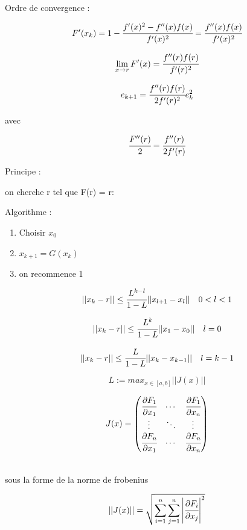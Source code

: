 Ordre de convergence :

$$ F'(x_k) = 1 - \cfrac{f'(x)^2 - f''(x)f(x)}{f'(x)^2} = \cfrac{f''(x)f(x)}{f'(x)^2}$$

$$\lim_{x \to r} F'(x) = \cfrac{f''(r)f(r)}{f'(r)^2}$$ 

$$ e_{k+1} = \cfrac{f''(r)f(r)}{2f'(r)^2} e_k^2$$ 

avec 

$$\cfrac{F''(r)}{2} = \cfrac{f''(r)}{2f'(r)}$$



Principe :

on cherche r tel que F(r) = r:


Algorithme :

\begin{enumerate}
    \item Choisir $x_0$
    \item $x_{k+1} = G(x_k)$
    \item on recommence 1
\end{enumerate}

$$||x_{k} - r|| \leq \cfrac{L^{k-l}}{1-L} ||x_{l+1} - x_{l}|| \quad  0 < l < 1$$


$$||x_{k} - r|| \leq \cfrac{L^{k}}{1-L} ||x_{1} - x_{0}|| \quad  l = 0$$


$$||x_{k} - r|| \leq \cfrac{L}{1-L} ||x_{k} - x_{k-1}|| \quad  l = k-1$$

$$ L := max_{x \in [a,b]} ||J(x)||$$


$$J(x) = \begin{pmatrix}
    \cfrac{\partial F_1}{\partial x_1} &  \cdots & \cfrac{\partial F_1}{\partial x_n} \\
    \vdots  & \ddots & \vdots  \\
    \cfrac{\partial F_n}{\partial x_1} & \cdots & \cfrac{\partial F_n}{\partial x_n}

\end{pmatrix}$$


\\
sous la forme de la norme de frobenius

$$||J(x)|| = \sqrt{\sum_{i=1}^{n} \sum_{j=1}^{n} \left\lvert \cfrac{\partial F_i}{\partial x_j} \right\rvert^2}$$

